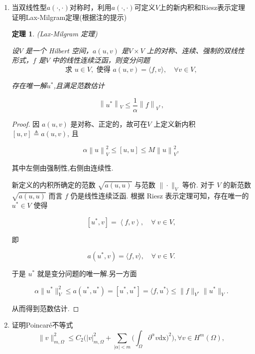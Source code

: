 \documentclass[12pt,a4paper]{article}
\newtheorem{theorem}{定理}
\begin{document}
\begin{enumerate}
\begin{proof}[解]
		\end{proof}
		
		\item 
		当双线性型$a(\cdot,\cdot)$对称时，利用$a(\cdot,\cdot)$可定义$V$上的新内积和Riesz表示定理证明Lax-Milgram定理(根据注的提示)
		
		\begin{theorem}(Lax-Milgram 定理)
			
			设$V$ 是一个 Hilbert 空间，$a(u,v)$ 是$V\times V$ 上的对称、连续、强制的双线性形式，$f$ 是$V$ 中的线性连续泛函，则变分问题
			$$\text{求 }u\in V,\text{ 使得 }a(u,v)=\langle f,v\rangle,\quad\forall v\in V,$$
			
			存在唯一解$u^*$,且满足范数估计
			
			$$
			\left\|u^*\right\|_V\leqslant\frac{1}{\alpha}\left\|f\right\|_{V^*},
			$$
			
		\end{theorem}
		
		\begin{proof}
			因 $a(u,v)$ 是对称、正定的，故可在$V$ 上定义新内积 $[u,v]\triangleq a(u,v)$, 且
			
			$$
			\alpha{\left\|u\right\|}_{V}^{2}\leqslant\left[u,u\right]\leqslant M{\left\|u\right\|}_{V}^{2},
			$$
			
			其中左侧由强制性,右侧由连续性.
			
			新定义的内积所确定的范数 $\sqrt{a(u,u)}$ 与范数 $\|\cdot\|_V$ 等价. 对于 $V$ 的新范数$\sqrt{a(u,u)}$ 而言 $f$ 仍是线性连续泛函. 根据 Riesz 表示定理可知，存在唯一的 $u^*\in V$ 使得
			
			$$
			[u^*,v]=\left\langle f,v\right\rangle,\quad\forall\:v\in V,
			$$
			
			即
			
			$$
			a(u^*,v)=\langle f,v\rangle,\quad\forall\:v\in V.
			$$
			
			于是 $u^*$ 就是变分问题的唯一解.另一方面
			
			$$
			\alpha\|u^*\|_V^2\leqslant a(u^*,u^*)=[u^*,u^*]=\langle f,u^*\rangle\leqslant\|f\|_{V^*}\|u^*\|_V.
			$$
			
			从而得到范数估计.
		\end{proof}
		
		\item 证明Poincaré不等式
		\begin{equation}\label{poincare}
			\|v\|_{m,\Omega}^2\leq C_2\Big(|v|_{m,\Omega}^2+\sum_{|\alpha|<m}\Big(\int_\Omega\partial^\alpha v\mathrm{dx}\Big)^2\Big),\forall v\in H^m(\Omega),
		\end{equation}
		

\end{enumerate}
\end{document}
